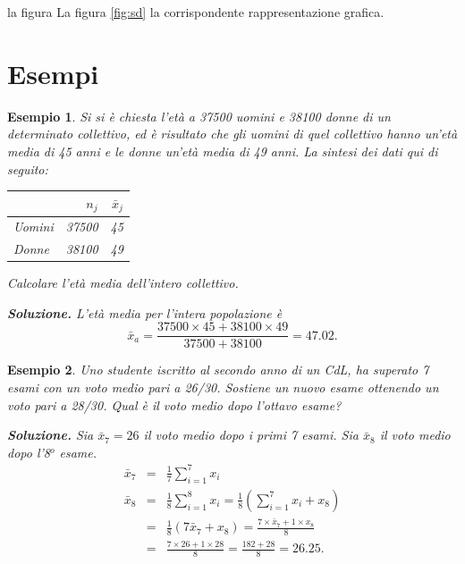 \documentclass[
  11pt,
]{book}
\theoremstyle{mytheoremstyle}
\theoremstyle{mydefstyle}
\newtheorem{example}{{Esempio}}[section]
\begin{document}
la figura La figura \ref{fig:sd} la corrispondente rappresentazione grafica.

\section{Esempi}\label{esempi}

\begin{example}
Si si è chiesta l'età a 37500 uomini e 38100 donne di un determinato collettivo, ed è risultato
che gli uomini di quel collettivo hanno un'età media di 45 anni e le donne un'età media di 49 anni. La sintesi dei dati qui di seguito:

\begin{table}[H]
\centering
\begin{tabular}{lrr}
\toprule
  & $n_j$ & $\bar x_j$\\
\midrule
Uomini & 37500 & 45\\
Donne & 38100 & 49\\
\bottomrule
\end{tabular}
\end{table}

Calcolare l'età media dell'intero collettivo.

\textbf{Soluzione.}
L'età media per l'intera popolazione è
\begin{displaymath}
  \bar{x}_{a}
= \frac{37500 \times 45 + 38100 \times 49} {37500 + 38100}
= 47.02 .
\end{displaymath}
\end{example}

\begin{example}
Uno studente iscritto al secondo anno di un CdL, ha superato 7
esami con un voto medio pari a 26/30. Sostiene un nuovo esame
ottenendo un voto pari a 28/30. Qual è il voto medio dopo
l'ottavo esame?

\textbf{Soluzione.}
Sia \(\bar{x}_{7}=26\) il voto medio dopo i primi 7 esami.
Sia \(\bar{x}_{8}\) il voto medio dopo l'8\(^{o}\) esame.
\begin{eqnarray*}
    \bar{x}_{7}
&=& \frac{1} {7} \sum_{i=1}^{7} x_{i}  \\
    \bar{x}_{8}
&=& \frac{1} {8} \sum_{i=1}^{8} x_{i}
 =  \frac{1} {8} \left( \sum_{i=1}^{7} x_{i} + x_{8} \right)   \\
&=& \frac{1} {8} \left( 7 \bar{x}_{7} + x_{8} \right)
 =  \frac{7  \times  \bar{x}_{7} + 1  \times  x_{8}} {8} \\
&=& \frac{7 \times  26 + 1  \times  28} {8}
 =  \frac{182 + 28} {8}
 =  26.25  .
\end{eqnarray*}
\end{example}
\end{document}
